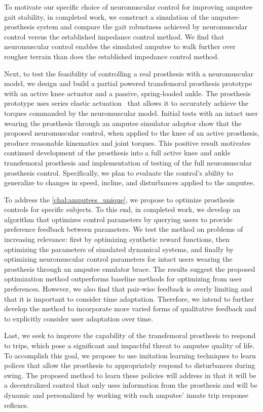 To motivate our specific choice of neuromuscular control for improving amputee
gait stability, in completed work, we construct a simulation of the
amputee-prosthesis system and compare the gait robustness achieved by
neuromuscular control versus the established impedance control method. We find
that neuromuscular control enables the simulated amputee to walk further over
rougher terrain than does the established impedance control method.

Next, to test the feasibility of controlling a real prosthesis with a
neuromuscular model, we design and build a partial powered transfemoral
prosthesis prototype with an active knee actuator and a passive, spring-loaded
ankle. The prosthesis prototype uses series elastic
actuation~\citep{pratt1995series} that allows it to accurately achieve the
torques commanded by the neuromuscular model. Initial tests with an intact user
wearing the prosthesis through an amputee simulator adaptor show that the
proposed neuromuscular control, when applied to the knee of an active
prosthesis, produce reasonable kinematics and joint torques. This positive
result motivates continued development of the prosthesis into a full active knee
and ankle transfemoral prosthesis and implementation of testing of the full
neuromuscular prosthesis control. Specifically, we plan to evaluate the
control's ability to generalize to changes in speed, incline, and disturbances
applied to the amputee.

To address the \cref{chal:amputees_unique}, we propose to optimize prosthesis
controls for specific subjects. To this end, in completed work, we develop an
algorithm that optimizes control parameters by querying users to provide
preference feedback between parameters. We test the method on problems of
increasing relevance: first by optimizing synthetic reward functions, then
optimizing the parameters of simulated dynamical systems, and finally by
optimizing neuromuscular control parameters for intact users wearing the
prosthesis through an amputee emulator brace. The results suggest the proposed
optimization method outperforms baseline methods for optimizing from user
preferences. However, we also find that pair-wise feedback is overly limiting
and that it is important to consider time adaptation. Therefore, we intend to
further develop the method to incorporate more varied forms of qualitative
feedback and to explicitly consider user adaptation over time.

Last, we seek to improve the capability of the transfemoral prosthesis to
respond to trips, which pose a significant and impactful threat to amputee
quality of life. To accomplish this goal, we propose to use imitation learning
techniques \citep{argall2009survey} to learn polices that allow the prosthesis
to appropriately respond to disturbances during swing.  The proposed method to
learn these policies will address 
in that it will be a decentralized control that only uses information from the
prosthesis and will be dynamic and personalized by working with each amputee'
innate trip response reflexes.

